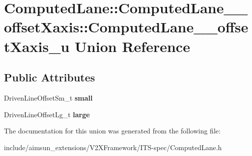 \hypertarget{unionComputedLane_1_1ComputedLane____offsetXaxis_1_1ComputedLane____offsetXaxis__u}{}\section{Computed\+Lane\+:\+:Computed\+Lane\+\_\+\+\_\+offset\+Xaxis\+:\+:Computed\+Lane\+\_\+\+\_\+offset\+Xaxis\+\_\+u Union Reference}
\label{unionComputedLane_1_1ComputedLane____offsetXaxis_1_1ComputedLane____offsetXaxis__u}
\subsection*{Public Attributes}
\begin{DoxyCompactItemize}
\item 
Driven\+Line\+Offset\+Sm\+\_\+t {\bfseries small}\hypertarget{unionComputedLane_1_1ComputedLane____offsetXaxis_1_1ComputedLane____offsetXaxis__u_ac4a2a617bb794ce411f841759169c3eb}{}\label{unionComputedLane_1_1ComputedLane____offsetXaxis_1_1ComputedLane____offsetXaxis__u_ac4a2a617bb794ce411f841759169c3eb}

\item 
Driven\+Line\+Offset\+Lg\+\_\+t {\bfseries large}\hypertarget{unionComputedLane_1_1ComputedLane____offsetXaxis_1_1ComputedLane____offsetXaxis__u_af706a172f5815246ad8dcf37bc09e92f}{}\label{unionComputedLane_1_1ComputedLane____offsetXaxis_1_1ComputedLane____offsetXaxis__u_af706a172f5815246ad8dcf37bc09e92f}

\end{DoxyCompactItemize}


The documentation for this union was generated from the following file\+:\begin{DoxyCompactItemize}
\item 
include/aimsun\+\_\+extensions/\+V2\+X\+Framework/\+I\+T\+S-\/spec/Computed\+Lane.\+h\end{DoxyCompactItemize}

